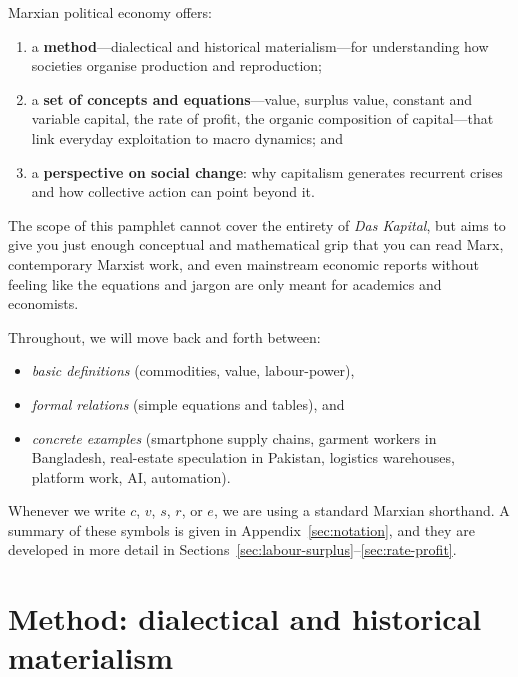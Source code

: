 Marxian political economy offers:

\begin{enumerate}[leftmargin=1.5em]
  \item a \textbf{method}---dialectical and historical materialism---for
  understanding how societies organise production and reproduction;

  \item a \textbf{set of concepts and equations}---value, surplus value,
  constant and variable capital, the rate of profit, the organic composition
  of capital---that link everyday exploitation to macro dynamics; and

  \item a \textbf{perspective on social change}: why capitalism generates
  recurrent crises and how collective action can point beyond it.
\end{enumerate}

The scope of this pamphlet cannot cover the entirety of \emph{Das Kapital}, but aims to give you just enough
conceptual and mathematical grip that you can read Marx, contemporary Marxist
work, and even mainstream economic reports without feeling like the equations
and jargon are only meant for academics and economists.

Throughout, we will move back and forth between:

\begin{itemize}[leftmargin=1.5em]
  \item \emph{basic definitions} (commodities, value, labour-power),
  \item \emph{formal relations} (simple equations and tables), and
  \item \emph{concrete examples} (smartphone supply chains, garment workers in
  Bangladesh, real-estate speculation in Pakistan, logistics warehouses,
  platform work, AI, automation).
\end{itemize}

Whenever we write $c$, $v$, $s$, $r$, or $e$, we are using
a standard Marxian shorthand. A summary of these symbols is given in Appendix~\ref{sec:notation}, and they are developed
in more detail in Sections~\ref{sec:labour-surplus}--\ref{sec:rate-profit}.


\section{Method: dialectical and historical materialism}
\label{sec:method}

